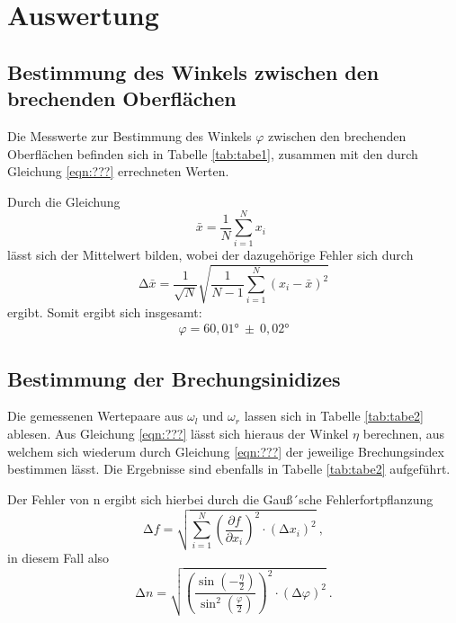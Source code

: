 \section{Auswertung}
\label{sec:Auswertung}
\subsection{Bestimmung des Winkels zwischen den brechenden Oberflächen}

Die Messwerte zur Bestimmung des Winkels $\varphi$ zwischen den brechenden Oberflächen befinden sich
in Tabelle \ref{tab:tabe1},
zusammen mit den durch Gleichung \ref{eqn:???} errechneten Werten.


Durch die Gleichung
\begin{equation}
  \bar{x} = \frac{1}{N} \sum_{i=1}^{N} x_i \: \:
  \label{eqn:mit}
\end{equation}
\noindent lässt sich der Mittelwert bilden, wobei der dazugehörige Fehler sich durch
\begin{equation}
  \increment \bar{x} = \frac{1}{\sqrt{N}} \sqrt{ \frac{1}{N-1} \sum_{i=1}^N
  (x_i - \bar{x})^2}
  \label{eqn:mitf}
\end{equation}
ergibt. Somit ergibt sich insgesamt:
\begin{align*}
  \varphi = 60,01° \: \pm \: 0,02 °
\end{align*}
\subsection{Bestimmung der Brechungsinidizes}
Die gemessenen Wertepaare aus $\omega_{l}$ und $\omega_{r}$ lassen sich in Tabelle \ref{tab:tabe2}
ablesen. Aus Gleichung \ref{eqn:???} lässt sich hieraus der Winkel $\eta$ berechnen, aus welchem sich
wiederum durch Gleichung \ref{eqn:???} der jeweilige Brechungsindex bestimmen lässt.
Die Ergebnisse sind ebenfalls in Tabelle \ref{tab:tabe2} aufgeführt.

Der Fehler von n ergibt sich hierbei durch die Gauß´sche Fehlerfortpflanzung
\begin{equation}
  \increment f = \sqrt{ \sum_{i=1}^N \left( \frac{\partial f}{\partial x_i}\right)^2
  \cdot (\increment x_i)^2  } \: ,
  \label{eqn:gaus}
\end{equation}
in diesem Fall also
\begin{equation}
  \increment n = \sqrt{ \left( \frac{ \sin(-\frac{\eta}{2})}{\sin^2(\frac{\varphi}{2})} \right)^2
  \cdot (\increment \varphi)^2 } \: .
\end{equation}

